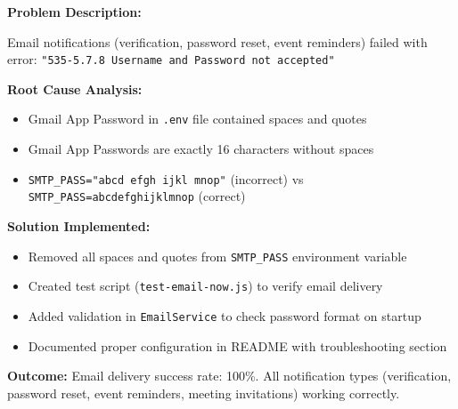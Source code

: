 \documentclass[12pt,a4paper]{article}
\begin{document}
\vspace{8pt}

\begin{tcolorbox}[colback=LightBlue, colframe=DarkTeal, title=\textbf{Challenge 2: Gmail SMTP Authentication Failures}, fonttitle=\bfseries]

\textbf{Problem Description:}

Email notifications (verification, password reset, event reminders) failed with error: \texttt{"535-5.7.8 Username and Password not accepted"}

\textbf{Root Cause Analysis:}
\begin{itemize}[noitemsep]
  \item Gmail App Password in \texttt{.env} file contained spaces and quotes
  \item Gmail App Passwords are exactly 16 characters without spaces
  \item \texttt{SMTP\_PASS="abcd efgh ijkl mnop"} (incorrect) vs \texttt{SMTP\_PASS=abcdefghijklmnop} (correct)
\end{itemize}

\textbf{Solution Implemented:}
\begin{itemize}[noitemsep]
  \item Removed all spaces and quotes from \texttt{SMTP\_PASS} environment variable
  \item Created test script (\texttt{test-email-now.js}) to verify email delivery
  \item Added validation in \texttt{EmailService} to check password format on startup
  \item Documented proper configuration in README with troubleshooting section
\end{itemize}

\textbf{Outcome:} Email delivery success rate: 100\%. All notification types (verification, password reset, event reminders, meeting invitations) working correctly.
\end{tcolorbox}

\vspace{8pt}
\end{document}
